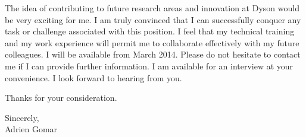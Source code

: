 \documentclass[10pt]{article}
\begin{document}
\noindent
The idea of contributing to future research areas and innovation at Dyson would be very exciting for me. I am truly convinced that I can successfully conquer any task or challenge associated with this position. I feel that my technical training and my work experience will permit me to collaborate effectively with my future colleagues.
I will be available from March 2014. Please do not hesitate to contact me if I can provide further information. I am available for an interview at your convenience.  I look forward to hearing from you.
\newline

\noindent
Thanks for your consideration.
\newline

\begin{flushright}
Sincerely, \\
Adrien Gomar
\end{flushright}
\end{document}
